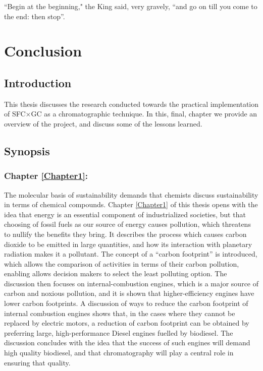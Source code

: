 
\begin{savequote}[\quotewidth]
``Begin at the beginning," the King said, very gravely, ``and go on till you come to the end: then stop''.
\end{savequote}

\chapter{Conclusion} %

\label{Chapter8} %

\section{Introduction}


This thesis discusses the research conducted towards the practical
implementation of SFC×GC as a chromatographic technique. In this, final, chapter
we provide an overview of the project, and discuss some of the lessons learned.

\section{Synopsis}

\subsection{Chapter \ref{Chapter1}:  }

The molecular basis of sustainability \autocite{Anastas2016} demands that
chemists discuss sustainability in terms of chemical compounds. Chapter
\ref{Chapter1} of this thesis opens with the idea that energy is an essential
component of industrialized societies, but that choosing of fossil fuels as our
source of energy causes pollution, which threatens to nullify the benefits they
bring. It describes the process which causes carbon dioxide to be emitted in
large quantities, and how its interaction with planetary radiation makes it a
pollutant. The concept of a ``carbon footprint'' is introduced, which allows the
comparison of activities in terms of their carbon pollution, enabling allows
decision makers to select the least polluting option. The discussion then
focuses on internal-combustion engines, which is a major source of carbon and
noxious pollution, and it is shown that higher-efficiency engines have lower
carbon footprints. A discussion of ways to reduce the carbon footprint of
internal combustion engines shows that, in the cases where they cannot be
replaced by electric motors, a reduction of carbon footprint can be obtained by
preferring large, high-performance Diesel engines fuelled by biodiesel. The
discussion concludes with the idea that the success of such engines will demand
high quality biodiesel, and that chromatography will play a central role in
ensuring that quality.

